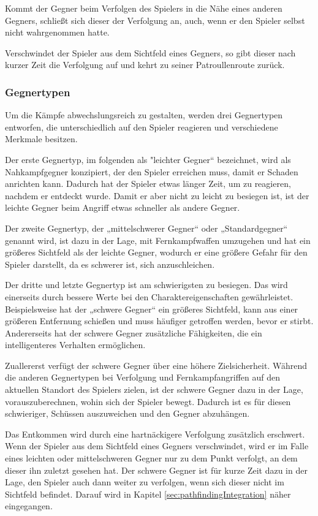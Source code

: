 Kommt der Gegner beim Verfolgen des Spielers in die Nähe eines anderen Gegners, schließt sich dieser der Verfolgung an, auch, wenn er den Spieler selbst nicht wahrgenommen hatte.

Verschwindet der Spieler aus dem Sichtfeld eines Gegners, so gibt dieser nach kurzer Zeit die Verfolgung auf und kehrt zu seiner Patroullenroute zurück.

\subsubsection{Gegnertypen}
\label{sec:enemyDesignTypes}

Um die Kämpfe abwechslungsreich zu gestalten, werden drei Gegnertypen entworfen, die unterschiedlich auf den Spieler reagieren und verschiedene Merkmale besitzen.

Der erste Gegnertyp, im folgenden als "leichter Gegner“ bezeichnet, wird als Nahkampfgegner konzipiert, der den Spieler erreichen muss, damit er Schaden anrichten kann. Dadurch hat der Spieler etwas länger Zeit, um zu reagieren, nachdem er entdeckt wurde. Damit er aber nicht zu leicht zu besiegen ist, ist der leichte Gegner beim Angriff etwas schneller als andere Gegner.

Der zweite Gegnertyp, der 
„mittelschwerer Gegner“ oder „Standardgegner“ genannt wird, ist dazu in der Lage, mit Fernkampfwaffen umzugehen und hat ein größeres Sichtfeld als der leichte Gegner, wodurch er eine größere Gefahr für den Spieler darstellt, da es schwerer ist, sich anzuschleichen.

Der dritte und letzte Gegnertyp ist am schwierigsten zu besiegen. Das wird einerseits durch bessere Werte bei den Charaktereigenschaften gewährleistet. Beispielsweise hat der „schwere Gegner“ ein größeres Sichtfeld, kann aus einer größeren Entfernung schießen und muss häufiger getroffen werden, bevor er stirbt. Andererseits hat der schwere Gegner zusätzliche Fähigkeiten, die ein intelligenteres Verhalten ermöglichen.

Zuallererst verfügt der schwere Gegner über eine höhere Zielsicherheit. Während die anderen Gegnertypen bei Verfolgung und Fernkampfangriffen auf den aktuellen Standort des Spielers zielen, ist der schwere Gegner dazu in der Lage, vorauszuberechnen, wohin sich der Spieler bewegt. Dadurch ist es für diesen schwieriger, Schüssen auszuweichen und den Gegner abzuhängen.

Das Entkommen wird durch eine hartnäckigere Verfolgung zusätzlich erschwert. Wenn der Spieler aus dem Sichtfeld eines Gegners verschwindet, wird er im Falle eines leichten oder mittelschweren Gegner nur zu dem Punkt verfolgt, an dem dieser ihn zuletzt gesehen hat. Der schwere Gegner ist für kurze Zeit dazu in der Lage, den Spieler auch dann weiter zu verfolgen, wenn sich dieser nicht im Sichtfeld befindet. Darauf wird in Kapitel \ref{sec:pathfindingIntegration} näher eingegangen.

